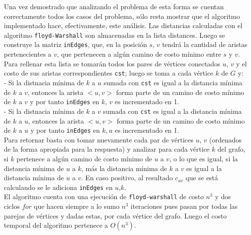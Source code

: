 \documentclass[a4paper,12pt,twocolumn]{article}
\begin{document}
	
	Una vez demostrado que analizando el problema de esta forma se cuentan correctamente todos los casos del problema, sólo resta mostrar que el algoritmo implementado hace, efectivamente, este análisis. Las distancias calculadas con el algoritmo \texttt{\ttfamily floyd-Warshall} son almacenadas en la lista distances. Luego se construye la matriz \texttt{\ttfamily inEdges}, que, en la posición $s$, $v$ tendrá la cantidad de aristas pertenecientes a $v$, que pertenecen a algún camino de costo mínimo entre $s$ y $v$. Para rellenar esta lista se tomarán todos los pares de vértices conectados $u$, $v$ y el costo de sus aristas correspondientes \texttt{\ttfamily cst}; luego se toma a cada vértice $k$ de $G$ y:\\
	- Si la distnacia mínima de $k$ a $u$ sumada con \texttt{\ttfamily cst} es igual a la distancia mínima de $k$ a $v$, entonces la arista $<u,v>$ forma parte de un camino de costo mínimo de $k$ a $v$ y por tanto \texttt{\ttfamily inEdges} en $k$, $v$ es incrementado en 1.\\
	- Si la distnacia mínima de $k$ a $v$ sumada con \texttt{\ttfamily cst} es igual a la distancia mínima de $k$ a $u$, entonces la arista $<u,v>$ forma parte de un camino de costo mínimo de $k$ a $u$ y por tanto \texttt{\ttfamily inEdges} en $k, u$ es incrementado en 1.\\
	Para retornar basta con tomar nuevamente cada par de vértices $u$, $v$ (ordenados de la forma apropiada para la respuesta) y analizar para cada vértice $k$ del grafo, si $k$ pertenece a algún camino de costo mínimo de $u$ a $v$, o lo que es igual, si la distancia mínima de $u$ a $k$, más la distancia mínima de $k$ a $v$ es igual a la distancia mínima de $u$ a $v$. En caso positivo, al resultado $c_{uv}$ que se está calculando se le adiciona \texttt{\ttfamily inEdges} en $u$,$k$.\\
	
	El algoritmo cuenta con una ejecución de \texttt{\ttfamily floyd-warshall} de costo $n^3$ y dos ciclos $for$ que hacen siempre a lo sumo $n^3$ iteraciones pues pasan por todas las parejas de vértices y dadas estas, por cada vértice del grafo. Luego el costo temporal del algoritmo pertenece a $O(n^3)$.\\
\label{end}
\end{document}

